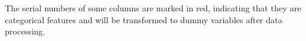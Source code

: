 \documentclass[11pt,a4paper]{article}
\begin{document}
\begin{figure}[H]
    \end{figure}
The serial numbers of some columns are marked in red, indicating that they are categorical features and will be transformed to dummy variables after data processing.
\end{document}
